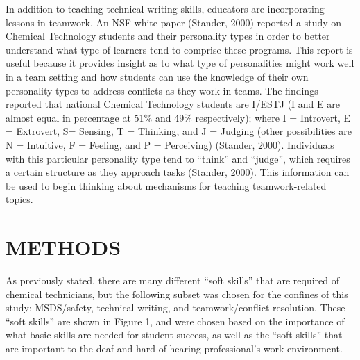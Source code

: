 \documentclass[11.5pt]{sig-alternate} %
\begin{document}
\begin{large}
In addition to teaching technical writing skills, educators are incorporating lessons in teamwork. An NSF white paper (Stander, 2000) reported a study on Chemical Technology students and their personality types in order to better understand what type of learners tend to comprise these programs. This report is useful because it provides insight as to what type of personalities might work well in a team setting and how students can use the knowledge of their own personality types to address conflicts as they work in teams. The findings reported that national Chemical Technology students are I/ESTJ (I and E are almost equal in percentage at 51\% and 49\% respectively); where I = Introvert, E = Extrovert, S= Sensing, T = Thinking, and J = Judging (other possibilities are N = Intuitive, F = Feeling, and P = Perceiving) (Stander, 2000). Individuals with this particular personality type tend to “think” and “judge”, which requires a certain structure as they approach tasks (Stander, 2000). This information can be used to begin thinking about mechanisms for teaching teamwork-related topics.

\section*{METHODS}

As previously stated, there are many different “soft skills” that are required of chemical technicians, but the following subset was chosen for the confines of this study: MSDS/safety, technical writing, and teamwork/conflict resolution. These “soft skills” are shown in Figure 1, and were chosen based on the importance of what basic skills are needed for student success, as well as the “soft skills” that are important to the deaf and hard-of-hearing professional’s work environment.


\end{large}
\end{document}
